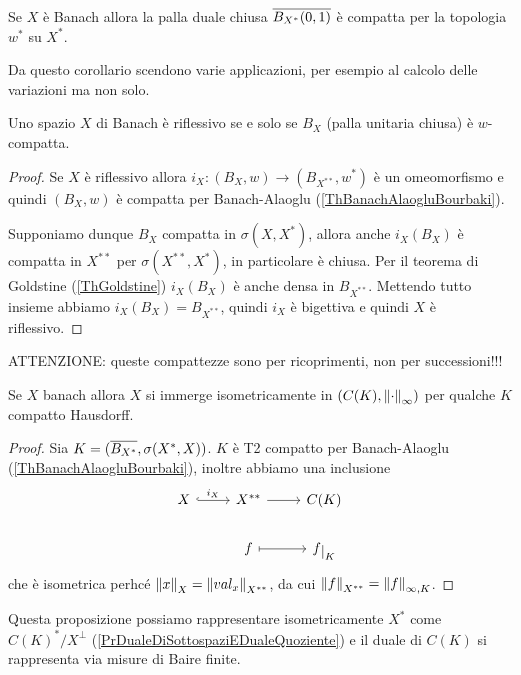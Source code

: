 \begin{corollary}
Se $X$ \`e Banach allora la palla duale chiusa $\overline{B_{X^\ast}(0,1)}$ \`e compatta per la topologia $w^\ast$ su $X^\ast$.
\end{corollary}

\begin{remark}
Da questo corollario scendono varie applicazioni, per esempio al calcolo delle variazioni ma non solo.
\end{remark}



\begin{theorem}[Kakutani]\label{ThKakutani}
Uno spazio $X$ di Banach \`e riflessivo se e solo se $B_X$ (palla unitaria chiusa) \`e $w$-compatta.
\end{theorem}
\begin{proof}
Se $X$ \`e riflessivo allora $i_X: (B_{X}, w)\to (B_{X^{\ast\ast}},w^\ast)$ \`e un omeomorfismo e quindi $(B_X,w)$ \`e compatta per Banach-Alaoglu (\ref{ThBanachAlaogluBourbaki}).

Supponiamo dunque $B_X$ compatta in $\sigma(X,X^\ast)$, allora anche $i_X(B_X)$ \`e compatta in $X^{\ast\ast}$ per $\sigma(X^{\ast\ast},X^\ast)$, in particolare \`e chiusa. Per il teorema di Goldstine (\ref{ThGoldstine}) $i_X(B_X)$ \`e anche densa in $B_{X^{\ast\ast}}$. Mettendo tutto insieme abbiamo $i_X(B_X)=B_{X^{\ast\ast}}$, quindi $i_X$ \`e bigettiva e quindi $X$ \`e riflessivo.
\end{proof}

\begin{remark}
ATTENZIONE: queste compattezze sono per ricoprimenti, non per successioni!!!
\end{remark}

\begin{proposition}\label{PrBanchSiImmergonoInContinueSuCompatto}
Se $X$ banach allora $X$ si immerge isometricamente in $(C(K),\left\Vert{\cdot}\right\Vert_\infty)$ per qualche $K$ compatto Hausdorff.
\end{proposition}
\begin{proof}
Sia $K=(\overline{B_{X^\ast}},\sigma(X^\ast,X))$. $K$ \`e T2 compatto per Banach-Alaoglu (\ref{ThBanachAlaogluBourbaki}), inoltre abbiamo una inclusione
\[\begin{tikzcd}
	X & {X^{\ast\ast}} & {C(K)} \\
	& f & {f\res K}
	\arrow["{i_X}", hook, from=1-1, to=1-2]
	\arrow[from=1-2, to=1-3]
	\arrow[maps to, from=2-2, to=2-3]
\end{tikzcd}\]
che \`e isometrica perhc\'e $\left\Vert{x}\right\Vert_X=\left\Vert{val_x}\right\Vert_{X^{\ast\ast}}$, da cui $\left\Vert{f}\right\Vert_{X^{\ast\ast}}=\left\Vert{f}\right\Vert_{\infty,K}$.
\end{proof}


\begin{remark}
Questa proposizione possiamo rappresentare isometricamente $X^\ast$ come $C(K)^\ast/X^\perp$ (\ref{PrDualeDiSottospaziEDualeQuoziente}) e il duale di $C(K)$ si rappresenta via misure di Baire finite.
\end{remark}